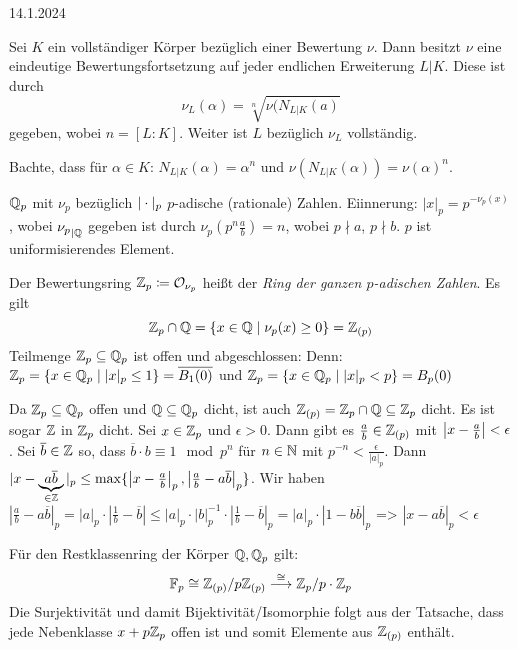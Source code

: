 \documentclass[../main.tex]{subfiles}
\begin{document}
\begin{flushright}
    14.1.2024
\end{flushright}

\begin{theorem}
    Sei $K$ ein vollständiger Körper bezüglich einer Bewertung $\nu$.
    Dann besitzt $\nu$ eine eindeutige Bewertungsfortsetzung auf jeder endlichen Erweiterung $L|K$.
    Diese ist durch $$\nu_L(\alpha) = \sqrt[n]{\nu(N_{L|K}(a)}$$ gegeben, wobei $n=[L:K]$. Weiter ist $L$ bezüglich $\nu_L$ vollständig.
\end{theorem}
Bachte, dass für $\alpha\in K$:
$N_{L|K}(\alpha) = \alpha^n $ und
$\nu(N_{L|K}(\alpha)) = \nu(\alpha)^n$.

\begin{remark}
    $\mathbb{Q}_p$ mit $\nu_p$ bezüglich $|\cdot|_p$ $p$-adische (rationale) Zahlen.
    Eiinnerung: $|x|_p = p^{-\nu_p(x)}$, wobei ${\nu_p}_{|\mathbb{Q}}$ gegeben ist durch $\nu_p(p^n\frac{a}{b}) = n$, wobei $p\nmid a$, $p\nmid b$.
    $p$ ist uniformisierendes Element.

    Der Bewertungsring $\mathbb{Z}_p\coloneqq \mathcal{O}_{\nu_p}$ heißt der \emph{Ring der ganzen $p$-adischen Zahlen}.
    Es gilt $$\mathbb{Z}_p\cap \mathbb{Q} = \{x\in\mathbb{Q}\mid \nu_p(x)\geq 0\} = \mathbb{Z}_{(p)}$$
    Teilmenge $\mathbb{Z}_p\subseteq\mathbb{Q}_p$ ist offen und abgeschlossen:
    Denn: 
    $\mathbb{Z}_p = \{x\in\mathbb{Q}_p\mid |x|_p \leq 1\} = \overline{B_1(0)}$ und
    $\mathbb{Z}_p = \{x\in\mathbb{Q}_p\mid |x|_p<p\} = B_p(0)$ %

    Da $\mathbb{Z}_p\subseteq \mathbb{Q}_p$ offen und $\mathbb{Q}\subseteq \mathbb{Q}_p$ dicht, ist auch $\mathbb{Z}_{(p)} = \mathbb{Z}_p\cap \mathbb{Q} \subseteq \mathbb{Z}_p$ dicht.
    Es ist sogar $\mathbb{Z}$ in $\mathbb{Z}_p$ dicht.
    Sei $x\in \mathbb{Z}_p$ und $\epsilon>0$. Dann gibt es $\frac{a}{b}\in \mathbb{Z}_{(p)}$ mit $\left\vert x-\frac{a}{b} \right\vert<\epsilon$.
    Sei $\overline{b}\in \mathbb{Z}$ so, dass $\overline{b}\cdot b \equiv 1\mod p^n$ für $n\in \mathbb{N}$ mit $p^{-n} < \frac{\epsilon}{|a|_p}$. Dann $|x-\underbrace{a\overline{b}}_{\in \mathbb{Z}}|_p \leq \max \{\left\vert x-\frac{a}{b} \right\vert_p, \left\vert \frac{a}{b}-a\overline{b} \right\vert_p\}$.
    Wir haben $|\frac{a}{b}-a\overline{b}|_p = |a|_p\cdot |\frac{1}{b}-\overline{b}| \leq |a|_p \cdot |b|_p^{-1} \cdot |\frac{1}{b}-\overline{b}|_p = |a|_p\cdot |1-b\overline{b}|_p$
    => $|x-a\overline{b}|_p < \epsilon$

    Für den Restklassenring der Körper $\mathbb{Q}, \mathbb{Q}_p$ gilt:
    $$\mathbb{F}_p\cong \mathbb{Z}_{(p)}/p\mathbb{Z}_{(p)}\overset{\cong}{\longrightarrow} \mathbb{Z}_p/p\cdot \mathbb{Z}_p$$
    Die Surjektivität und damit Bijektivität/Isomorphie folgt aus der Tatsache, dass jede Nebenklasse $x+p\mathbb{Z}_p$ offen ist und somit Elemente aus $\mathbb{Z}_{(p)}$ enthält.


\end{remark}
\end{document}
